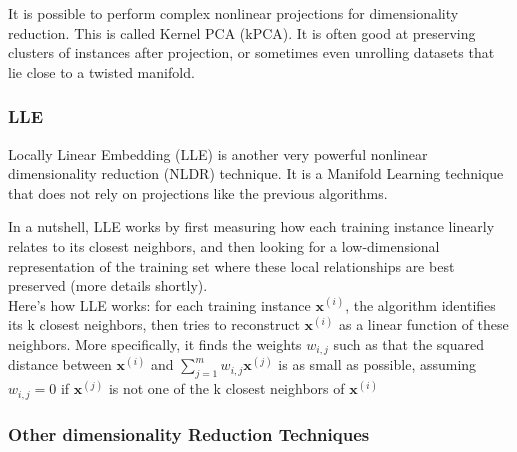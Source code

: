 \documentclass[french]{article}
\begin{document}
It is possible to perform complex nonlinear projections for dimensionality reduction. This is called Kernel PCA (kPCA).  It is often good at preserving clusters of instances after projection, or sometimes even unrolling datasets that lie close to a twisted manifold.

\subsubsection{LLE}

Locally Linear Embedding (LLE) is another very powerful nonlinear dimensionality reduction (NLDR) technique.  It is a Manifold Learning technique that does not rely on projections like the previous algorithms.

In a nutshell, LLE works by first measuring how each training instance linearly relates to its closest neighbors, and then looking for a low-dimensional representation of the training set where these local relationships are best preserved (more details shortly).\\

Here's how LLE works: for each training instance $\bm{x}^{(i)}$, the algorithm identifies its k closest neighbors, then tries to reconstruct $\bm{x}^{(i)}$ as a linear function of these neighbors. More specifically, it finds the weights $w_{i,j}$ such as that the squared distance between $\bm{x}^{(i)}$ and $\sum_{j=1}^m w_{i,j} \bm{x}^{(j)}$ is as small as possible, assuming $w_{i,j} = 0$ if $\bm{x}^{(j)}$ is not one of the k closest neighbors of $\bm{x}^{(i)}$

\subsubsection{Other dimensionality Reduction Techniques}
\end{document}
